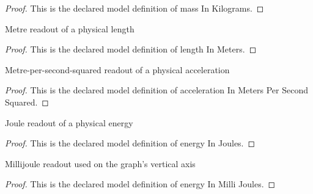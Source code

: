 \begin{proof}
  This is the declared model definition of mass In Kilograms.
\end{proof}
\begin{definition}
  \label{def:physics:phyx-mini-0274:phyxminiproblems-problemphyxmini0274-lengthinmeters}
  Metre readout of a physical length
\end{definition}
\begin{proof}
  This is the declared model definition of length In Meters.
\end{proof}
\begin{definition}
  \label{def:physics:phyx-mini-0274:phyxminiproblems-problemphyxmini0274-accelerationinmeterspersecondsquared}
  Metre-per-second-squared readout of a physical acceleration
\end{definition}
\begin{proof}
  This is the declared model definition of acceleration In Meters Per Second Squared.
\end{proof}
\begin{definition}
  \label{def:physics:phyx-mini-0274:phyxminiproblems-problemphyxmini0274-energyinjoules}
  Joule readout of a physical energy
\end{definition}
\begin{proof}
  This is the declared model definition of energy In Joules.
\end{proof}
\begin{definition}
  \label{def:physics:phyx-mini-0274:phyxminiproblems-problemphyxmini0274-energyinmillijoules}
  Millijoule readout used on the graph's vertical axis
\end{definition}
\begin{proof}
  This is the declared model definition of energy In Milli Joules.
\end{proof}
